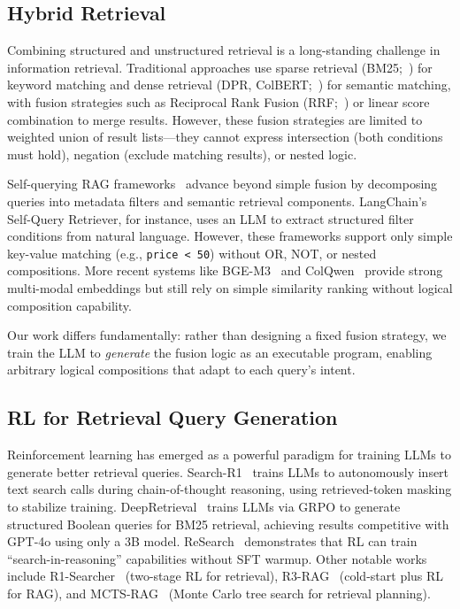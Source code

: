 \documentclass[11pt]{article}
\begin{document}
\subsection{Hybrid Retrieval}
\label{sec:hybrid_retrieval}

Combining structured and unstructured retrieval is a long-standing challenge in information retrieval.
Traditional approaches use sparse retrieval (BM25;~\citealp{robertson2009probabilistic}) for keyword matching and dense retrieval (DPR, ColBERT;~\citealp{karpukhin2020dense, khattab2020colbert}) for semantic matching, with fusion strategies such as Reciprocal Rank Fusion (RRF;~\citealp{cormack2009reciprocal}) or linear score combination to merge results.
However, these fusion strategies are limited to weighted union of result lists---they cannot express intersection (both conditions must hold), negation (exclude matching results), or nested logic.

Self-querying RAG frameworks~\cite{langchain2023selfquery} advance beyond simple fusion by decomposing queries into metadata filters and semantic retrieval components.
LangChain's Self-Query Retriever, for instance, uses an LLM to extract structured filter conditions from natural language.
However, these frameworks support only simple key-value matching (e.g., \texttt{price < 50}) without OR, NOT, or nested compositions.
More recent systems like BGE-M3~\cite{chen2024bge} and ColQwen~\cite{chen2024colqwen} provide strong multi-modal embeddings but still rely on simple similarity ranking without logical composition capability.

Our work differs fundamentally: rather than designing a fixed fusion strategy, we train the LLM to \emph{generate} the fusion logic as an executable program, enabling arbitrary logical compositions that adapt to each query's intent.

\subsection{RL for Retrieval Query Generation}
\label{sec:rl_retrieval}

Reinforcement learning has emerged as a powerful paradigm for training LLMs to generate better retrieval queries.
Search-R1~\cite{jin2025search} trains LLMs to autonomously insert text search calls during chain-of-thought reasoning, using retrieved-token masking to stabilize training.
DeepRetrieval~\cite{jiang2025deepretrieval} trains LLMs via GRPO to generate structured Boolean queries for BM25 retrieval, achieving results competitive with GPT-4o using only a 3B model.
ReSearch~\cite{chen2025research} demonstrates that RL can train ``search-in-reasoning'' capabilities without SFT warmup.
Other notable works include R1-Searcher~\cite{song2025r1searcher} (two-stage RL for retrieval), R3-RAG~\cite{du2025r3rag} (cold-start plus RL for RAG), and MCTS-RAG~\cite{zhang2025mctsrag} (Monte Carlo tree search for retrieval planning).
\end{document}
